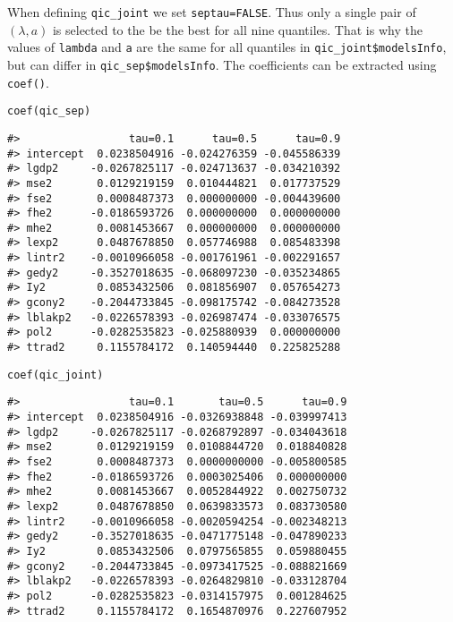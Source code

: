 When defining \texttt{qic\_joint} we set \texttt{septau=FALSE}. Thus only a single pair of \((\lambda,a)\) is selected to the be the best for all nine quantiles. That is why the values of \texttt{lambda} and \texttt{a} are the same for all quantiles in \texttt{qic\_joint\$modelsInfo}, but can differ in \texttt{qic\_sep\$modelsInfo}. The coefficients can be extracted using \texttt{coef()}.

\begin{verbatim}
coef(qic_sep)
\end{verbatim}

\begin{verbatim}
#>                 tau=0.1      tau=0.5      tau=0.9
#> intercept  0.0238504916 -0.024276359 -0.045586339
#> lgdp2     -0.0267825117 -0.024713637 -0.034210392
#> mse2       0.0129219159  0.010444821  0.017737529
#> fse2       0.0008487373  0.000000000 -0.004439600
#> fhe2      -0.0186593726  0.000000000  0.000000000
#> mhe2       0.0081453667  0.000000000  0.000000000
#> lexp2      0.0487678850  0.057746988  0.085483398
#> lintr2    -0.0010966058 -0.001761961 -0.002291657
#> gedy2     -0.3527018635 -0.068097230 -0.035234865
#> Iy2        0.0853432506  0.081856907  0.057654273
#> gcony2    -0.2044733845 -0.098175742 -0.084273528
#> lblakp2   -0.0226578393 -0.026987474 -0.033076575
#> pol2      -0.0282535823 -0.025880939  0.000000000
#> ttrad2     0.1155784172  0.140594440  0.225825288
\end{verbatim}

\begin{verbatim}
coef(qic_joint)
\end{verbatim}

\begin{verbatim}
#>                 tau=0.1       tau=0.5      tau=0.9
#> intercept  0.0238504916 -0.0326938848 -0.039997413
#> lgdp2     -0.0267825117 -0.0268792897 -0.034043618
#> mse2       0.0129219159  0.0108844720  0.018840828
#> fse2       0.0008487373  0.0000000000 -0.005800585
#> fhe2      -0.0186593726  0.0003025406  0.000000000
#> mhe2       0.0081453667  0.0052844922  0.002750732
#> lexp2      0.0487678850  0.0639833573  0.083730580
#> lintr2    -0.0010966058 -0.0020594254 -0.002348213
#> gedy2     -0.3527018635 -0.0471775148 -0.047890233
#> Iy2        0.0853432506  0.0797565855  0.059880455
#> gcony2    -0.2044733845 -0.0973417525 -0.088821669
#> lblakp2   -0.0226578393 -0.0264829810 -0.033128704
#> pol2      -0.0282535823 -0.0314157975  0.001284625
#> ttrad2     0.1155784172  0.1654870976  0.227607952
\end{verbatim}

